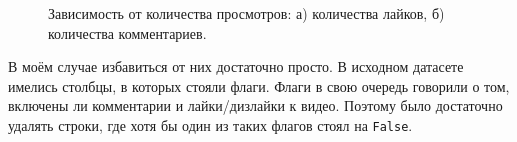 \documentclass[12pt]{article}
\begin{document}
	\begin{figure}[h]
        \begin{minipage}[h]{0.49\linewidth}
        \end{minipage}
        \hfill
        \begin{minipage}[h]{0.49\linewidth}
        \end{minipage}
        \caption{Зависимость от количества просмотров: а) количества лайков, б) количества комментариев.}
        \label{ris:image1}
    \end{figure}
    
    В моём случае избавиться от них достаточно просто. В исходном датасете имелись столбцы, в которых стояли флаги. Флаги в свою очередь говорили о том, включены ли комментарии и лайки/дизлайки к видео. Поэтому было достаточно удалять строки, где хотя бы один из таких флагов стоял на {\tt False}.
    
\end{document}
